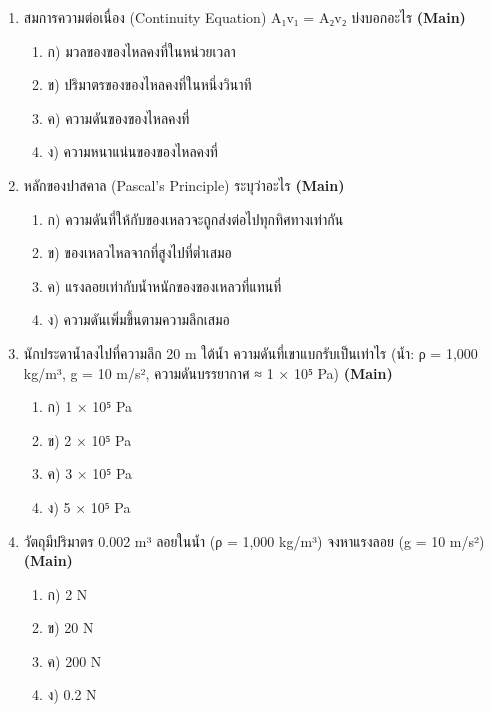 \documentclass[12pt]{article}
\begin{document}
\begin{enumerate}[label=\arabic*.]
\begin{enumerate}[label=)]
\item ก) P + ½ρv² + ρgh = คงที่
\item ข) P × A = คงที่
\item ค) F = ρAV²
\item ง) P = ρgh
\end{enumerate}
\item สมการความต่อเนื่อง (Continuity Equation) A₁v₁ = A₂v₂ บ่งบอกอะไร \hfill \textbf{\small (Main)}
\begin{enumerate}[label=)]
\item ก) มวลของของไหลคงที่ในหน่วยเวลา
\item ข) ปริมาตรของของไหลคงที่ในหนึ่งวินาที
\item ค) ความดันของของไหลคงที่
\item ง) ความหนาแน่นของของไหลคงที่
\end{enumerate}
\item หลักของปาสคาล (Pascal's Principle) ระบุว่าอะไร \hfill \textbf{\small (Main)}
\begin{enumerate}[label=)]
\item ก) ความดันที่ให้กับของเหลวจะถูกส่งต่อไปทุกทิศทางเท่ากัน
\item ข) ของเหลวไหลจากที่สูงไปที่ต่ำเสมอ
\item ค) แรงลอยเท่ากับน้ำหนักของของเหลวที่แทนที่
\item ง) ความดันเพิ่มขึ้นตามความลึกเสมอ
\end{enumerate}
\item นักประดาน้ำลงไปที่ความลึก 20 m ใต้น้ำ ความดันที่เขาแบกรับเป็นเท่าไร (น้ำ: ρ = 1,000 kg/m³, g = 10 m/s², ความดันบรรยากาศ ≈ 1 × 10⁵ Pa) \hfill \textbf{\small (Main)}
\begin{enumerate}[label=)]
\item ก) 1 × 10⁵ Pa
\item ข) 2 × 10⁵ Pa
\item ค) 3 × 10⁵ Pa
\item ง) 5 × 10⁵ Pa
\end{enumerate}
\item วัตถุมีปริมาตร 0.002 m³ ลอยในน้ำ (ρ = 1,000 kg/m³) จงหาแรงลอย (g = 10 m/s²) \hfill \textbf{\small (Main)}
\begin{enumerate}[label=)]
\item ก) 2 N
\item ข) 20 N
\item ค) 200 N
\item ง) 0.2 N
\end{enumerate}

\end{enumerate}
\end{document}
